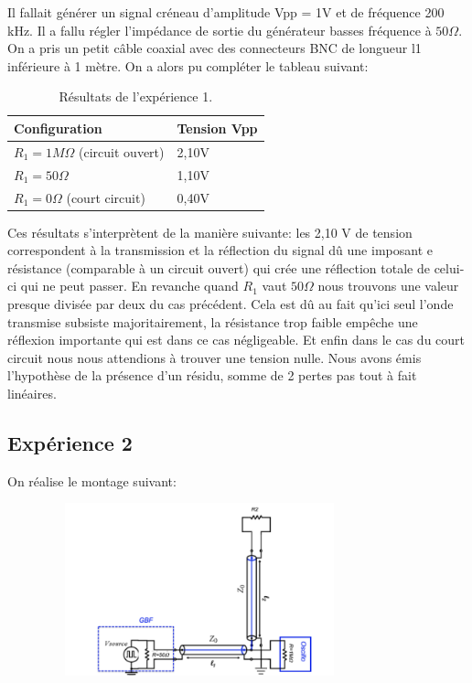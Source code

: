 \documentclass[12pt,a4paper, french]{article}
\begin{document}
        Il fallait générer un signal créneau d'amplitude Vpp = 1V et de 
        fréquence 200 kHz. Il a fallu régler l'impédance de sortie du générateur basses
         fréquence à $50\Omega $. On a pris un petit câble coaxial avec des connecteurs BNC de 
         longueur l1 inférieure à 1 mètre. On a alors pu compléter le tableau suivant:
    \begin{center}
        \begin{table}[!h]
        \centering
            \begin{tabular}{|l|l|} \hline
                Configuration & Tension Vpp \\ \hline
                $R_1=1M\Omega$ (circuit ouvert)& 2,10V \\ \hline
                $R_1=50\Omega $ & 1,10V \\ \hline
                $R_1=0\Omega $ (court circuit)&0,40V\\ \hline
            \end{tabular}
        \caption{Résultats de l'expérience 1.}
        \end{table}
        
    \end{center}
    
    Ces résultats s'interprètent de la manière suivante: les 2,10 V de 
    tension correspondent  à la transmission et la réflection du signal dû une imposant
    e résistance (comparable à un circuit ouvert) qui crée une réflection totale de 
    celui-ci qui ne peut passer. En revanche quand $R_1$ vaut $50\Omega $ nous trouvons 
    une valeur presque divisée par deux du cas précédent. Cela est dû au fait qu'ici seul 
    l'onde transmise subsiste majoritairement, la résistance trop faible empêche une
    réflexion importante qui est dans ce cas négligeable. Et enfin dans le cas du court 
    circuit nous nous attendions à trouver une tension nulle. Nous avons émis l'hypothèse
    de la présence d'un résidu, somme de 2 pertes pas tout à fait linéaires.
    
    \subsection{Expérience 2}
    
    On réalise le montage suivant:
    \begin{figure}[!h]
    \begin{center}
            \includegraphics[width=9cm,height=5cm]{schemaexp2.png}
    \end{center}
    \end{figure}
    
\end{document}
